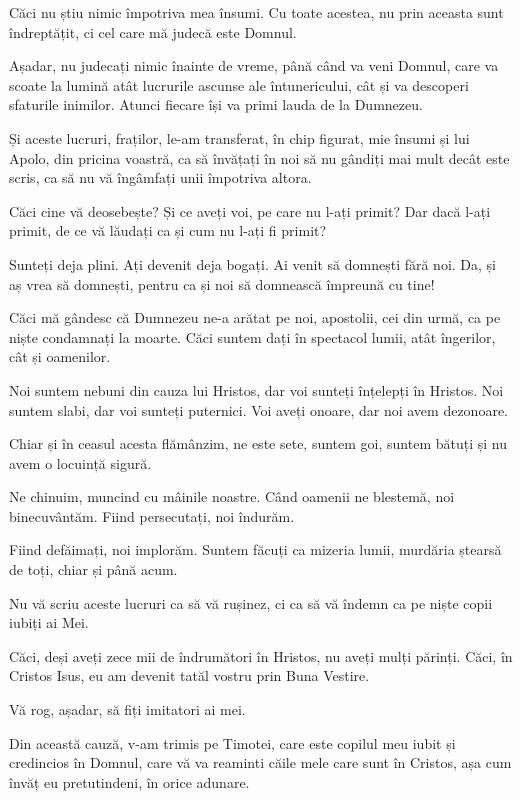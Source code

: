 {Căci nu știu nimic împotriva mea însumi. Cu toate acestea, nu prin aceasta sunt îndreptățit, ci cel care mă judecă este Domnul.

Așadar, nu judecați nimic înainte de vreme, până când va veni Domnul, care va scoate la lumină atât lucrurile ascunse ale întunericului, cât și va descoperi sfaturile inimilor. Atunci fiecare își va primi lauda de la Dumnezeu.


\par }{\PP {}Și aceste lucruri, fraților, le-am transferat, în chip figurat, mie însumi și lui Apolo, din pricina voastră, ca să învățați în noi să nu gândiți mai mult decât este scris, ca să nu vă îngâmfați unii împotriva altora.

Căci cine vă deosebește? Și ce aveți voi, pe care nu l-ați primit? Dar dacă l-ați primit, de ce vă lăudați ca și cum nu l-ați fi primit?


\par }{\PP {}Sunteți deja plini. Ați devenit deja bogați. Ai venit să domnești fără noi. Da, și aș vrea să domnești, pentru ca și noi să domnească împreună cu tine!

Căci mă gândesc că Dumnezeu ne-a arătat pe noi, apostolii, cei din urmă, ca pe niște condamnați la moarte. Căci suntem dați în spectacol lumii, atât îngerilor, cât și oamenilor.

Noi suntem nebuni din cauza lui Hristos, dar voi sunteți înțelepți în Hristos. Noi suntem slabi, dar voi sunteți puternici. Voi aveți onoare, dar noi avem dezonoare.

Chiar și în ceasul acesta flămânzim, ne este sete, suntem goi, suntem bătuți și nu avem o locuință sigură.

Ne chinuim, muncind cu mâinile noastre. Când oamenii ne blestemă, noi binecuvântăm. Fiind persecutați, noi îndurăm.

Fiind defăimați, noi implorăm. Suntem făcuți ca mizeria lumii, murdăria ștearsă de toți, chiar și până acum.


\par }{\PP {}Nu vă scriu aceste lucruri ca să vă rușinez, ci ca să vă îndemn ca pe niște copii iubiți ai Mei.

Căci, deși aveți zece mii de îndrumători în Hristos, nu aveți mulți părinți. Căci, în Cristos Isus, eu am devenit tatăl vostru prin Buna Vestire.

Vă rog, așadar, să fiți imitatori ai mei.

Din această cauză, v-am trimis pe Timotei, care este copilul meu iubit și credincios în Domnul, care vă va reaminti căile mele care sunt în Cristos, așa cum învăț eu pretutindeni, în orice adunare.

}

